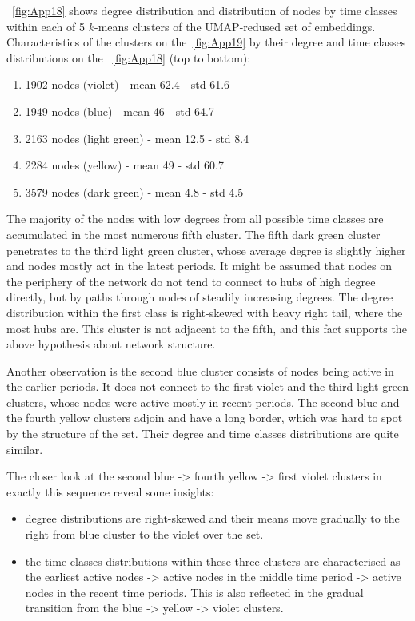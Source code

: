 ~\autoref{fig:App18} shows degree distribution and distribution of nodes by time classes within each of 5 $k$-means clusters of the UMAP-redused set of embeddings. Characteristics of the clusters on the~\autoref{fig:App19} by their degree and time classes distributions on the ~\autoref{fig:App18} (top to bottom):
    \begin{enumerate}
        \item 1902 nodes (violet) - mean 62.4 - std 61.6
        \item 1949 nodes (blue) - mean 46 - std 64.7
        \item 2163 nodes (light green) - mean 12.5 - std 8.4
        \item 2284 nodes (yellow) - mean 49 - std 60.7
        \item 3579 nodes (dark green) - mean 4.8 - std 4.5
    \end{enumerate}
The majority of the nodes with low degrees from all possible time classes are accumulated in the most numerous fifth cluster. The fifth dark green cluster penetrates to the third light green cluster, whose average degree is slightly higher and nodes mostly act in the latest periods. It might be assumed that nodes on the periphery of the network do not tend to connect to hubs of high degree directly, but by paths through nodes of steadily increasing degrees. The degree distribution within the first class is right-skewed with heavy right tail, where the most hubs are. This cluster is not adjacent to the fifth, and this fact supports the above hypothesis about network structure.

Another observation is the second blue cluster consists of nodes being active in the earlier periods. It does not connect to the first violet and the third light green clusters, whose nodes were active mostly in recent periods. The second blue and the fourth yellow clusters adjoin and have a long border, which was hard to spot by the structure of the set. Their degree and time classes distributions are quite similar. 

The closer look at the second blue -> fourth yellow -> first violet clusters in exactly this sequence reveal some insights: 
\begin{itemize}
    \item degree distributions are right-skewed and their means move gradually to the right from blue cluster to the violet over the set.
    \item the time classes distributions within these three clusters are characterised as the earliest active nodes -> active nodes in the middle time period -> active nodes in the recent time periods. This is also reflected in the gradual transition from the blue -> yellow -> violet clusters.
\end{itemize}


